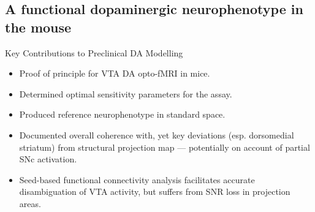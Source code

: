 		\subsection{A functional dopaminergic neurophenotype in the mouse}
			\begin{frame}{Key Contributions to Preclinical DA Modelling}
				\begin{itemize}
					\item Proof of principle for VTA DA opto-fMRI in mice.
					\item Determined optimal sensitivity parameters for the assay.
					\item Produced reference neurophenotype in standard space.
					\item Documented overall coherence with, yet key deviations (esp. dorsomedial striatum) from structural projection map — potentially on account of partial SNc activation.
					\item Seed-based functional connectivity analysis facilitates accurate disambiguation of VTA activity, but suffers from SNR loss in projection areas.
				\end{itemize}
			\end{frame}
		\tiny
		\printbibliography

